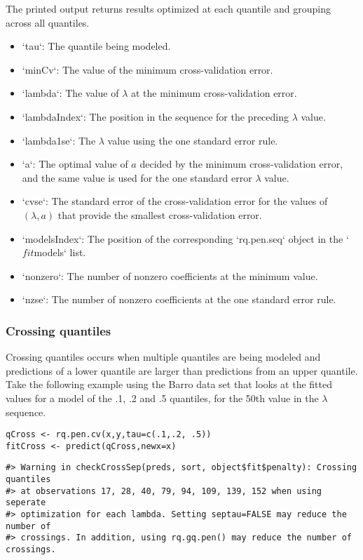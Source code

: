 The printed output returns results optimized at each quantile and grouping across all quantiles.

\begin{itemize}
\item `tau`: The quantile being modeled.
\item `minCv`: The value of the minimum cross-validation error.
\item `lambda`: The value of $\lambda$ at the minimum cross-validation error.
\item `lambdaIndex`: The position in the sequence for the preceding $\lambda$ value.
\item `lambda1se`: The $\lambda$ value using the one standard error rule.
\item `a`: The optimal value of $a$ decided by the minimum cross-validation error, and the same value is used for the one standard error $\lambda$ value.
\item `cvse`: The standard error of the cross-validation error for the values of $(\lambda,a)$ that provide the smallest cross-validation error.
\item `modelsIndex`: The position of the corresponding `rq.pen.seq` object in the `$fit$models` list.
\item `nonzero`: The number of nonzero coefficients at the minimum value.
\item `nzse`: The number of nonzero coefficients at the one standard error rule.
\end{itemize}

\subsubsection{Crossing quantiles}\label{crossing-quantiles}

Crossing quantiles occurs when multiple quantiles are being modeled and predictions of a lower quantile are larger than predictions from an upper quantile. Take the following example using the Barro data set that looks at the fitted values for a model of the .1, .2 and .5 quantiles, for the 50th value in the \(\lambda\) sequence.

\begin{verbatim}
qCross <- rq.pen.cv(x,y,tau=c(.1,.2, .5))
fitCross <- predict(qCross,newx=x)
\end{verbatim}

\begin{verbatim}
#> Warning in checkCrossSep(preds, sort, object$fit$penalty): Crossing quantiles
#> at observations 17, 28, 40, 79, 94, 109, 139, 152 when using seperate
#> optimization for each lambda. Setting septau=FALSE may reduce the number of
#> crossings. In addition, using rq.gq.pen() may reduce the number of crossings.
\end{verbatim}

